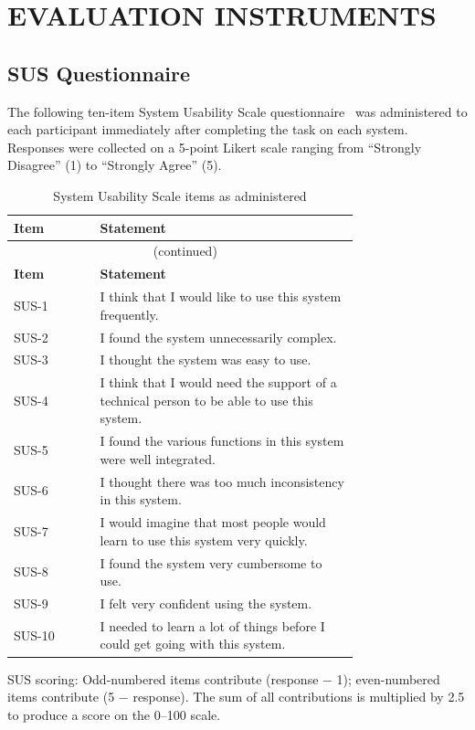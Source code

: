 \section{EVALUATION INSTRUMENTS}

\subsection{SUS Questionnaire}

The following ten-item System Usability Scale questionnaire~\cite{brooke1996}
was administered to each participant immediately after completing the task
on each system. Responses were collected on a 5-point Likert scale ranging
from ``Strongly Disagree'' (1) to ``Strongly Agree'' (5).

\begin{longtable}{lp{0.75\linewidth}}
  \caption{System Usability Scale items as administered} \label{tab:sus_items} \\
  \toprule
  \textbf{Item} & \textbf{Statement} \\
  \midrule
  \endfirsthead
  \multicolumn{2}{c}{\tablename\ \thetable{} (continued)} \\
  \toprule
  \textbf{Item} & \textbf{Statement} \\
  \midrule
  \endhead
  \bottomrule
  \endlastfoot
  SUS-1  & I think that I would like to use this system frequently. \\
  SUS-2  & I found the system unnecessarily complex. \\
  SUS-3  & I thought the system was easy to use. \\
  SUS-4  & I think that I would need the support of a technical person to be able to use this system. \\
  SUS-5  & I found the various functions in this system were well integrated. \\
  SUS-6  & I thought there was too much inconsistency in this system. \\
  SUS-7  & I would imagine that most people would learn to use this system very quickly. \\
  SUS-8  & I found the system very cumbersome to use. \\
  SUS-9  & I felt very confident using the system. \\
  SUS-10 & I needed to learn a lot of things before I could get going with this system. \\
\end{longtable}

\noindent
SUS scoring: Odd-numbered items contribute (response $-$ 1); even-numbered
items contribute (5 $-$ response). The sum of all contributions is
multiplied by 2.5 to produce a score on the 0--100 scale.

